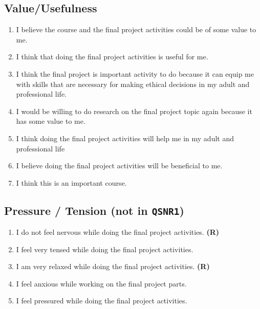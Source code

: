 \documentclass[letterpaper, nobind]{templates/ociamthesis}
\providecommand{\tightlist}{%
  \setlength{\itemsep}{0pt}\setlength{\parskip}{0pt}}
\begin{document}
\hypertarget{valueusefulness}{%
\subsection{Value/Usefulness}\label{valueusefulness}}

\begin{enumerate}
\def\labelenumi{\arabic{enumi}.}
\tightlist
\item
  I believe the course and the final project activities could be of some value to me.
\item
  I think that doing the final project activities is useful for me.
\item
  I think the final project is important activity to do because it can equip me with skills that are necessary for making ethical decisions in my adult and professional life.
\item
  I would be willing to do research on the final project topic again because it has some value to me.
\item
  I think doing the final project activities will help me in my adult and professional life
\item
  I believe doing the final project activities will be beneficial to me.
\item
  I think this is an important course.
\end{enumerate}

\hypertarget{pressure-tension-not-in-qsnr1}{%
\subsection{\texorpdfstring{Pressure / Tension (not in \texttt{QSNR1})}{Pressure / Tension (not in QSNR1)}}\label{pressure-tension-not-in-qsnr1}}

\begin{enumerate}
\def\labelenumi{\arabic{enumi}.}
\tightlist
\item
  I do not feel nervous while doing the final project activities. \textbf{(R)}
\item
  I feel very tensed while doing the final project activities.
\item
  I am very relaxed while doing the final project activities. \textbf{(R)}
\item
  I feel anxious while working on the final project parts.
\item
  I feel pressured while doing the final project activities.
\end{enumerate}
\end{document}
